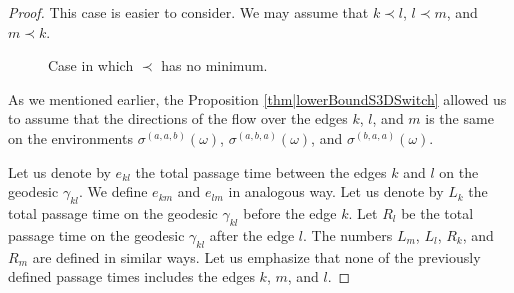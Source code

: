 \documentclass[10pt,a4paper]{amsart}
\begin{document}
\begin{proof}
 This case is easier to consider. We may assume that $k\prec l$, $l\prec m$, and $m\prec k$. 

 \begin{figure}[t]
 \centering
{}
\caption{Case in which $\prec$ has no minimum.}
\label{fig|LowerBound3NoMin}
\end{figure}

As we mentioned earlier, the Proposition \ref{thm|lowerBoundS3DSwitch} allowed us to assume that the directions of the flow over the edges $k$, $l$, and $m$ is the same on the environments 
$\sigma^{(a,a,b)}(\omega)$, $\sigma^{(a,b,a)}(\omega)$, and $\sigma^{(b,a,a)}(\omega)$.  

Let us denote by $e_{kl}$ the total passage time between the edges $k$ and $l$ on the geodesic $\gamma_{kl}$. We define $e_{km}$ and $e_{lm}$ in analogous way. 
Let us denote by $L_k$ the total passage time on the geodesic $\gamma_{kl}$ before the edge $k$. Let $R_l$ be the total passage time on the geodesic $\gamma_{kl}$ after the edge $l$. 
The numbers $L_m$, $L_l$, $R_k$, and $R_m$ are defined in similar ways. Let us emphasize that none of the previously defined passage times includes the edges $k$, $m$, and $l$. 


\end{proof}
\end{document}
